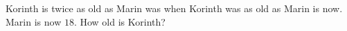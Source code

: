 Korinth is twice as old as Marin was when Korinth was as old as Marin is now. Marin is now $18$. How old is Korinth?
